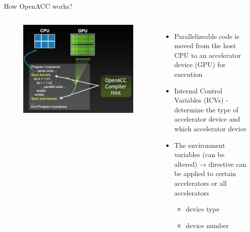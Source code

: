 \documentclass[aspectratio=169]{beamer}
\begin{document}
\begin{frame}[fragile]{How OpenACC works?}
\begin{columns}
\begin{figure}
\includegraphics[scale=0.3]{Graphics/How.png}
\end{figure}

\begin{itemize}
\item Parallelizeable code is moved from the host CPU to an accelerator device (GPU) for execution
\item Internal Control Variables (ICVs) - determine the type of accelerator device and which accelerator device
\item The environment variables (can be altered) → directive can be applied to certain accelerators or all accelerators 
\begin{itemize}
\item device type
\item device number
\end{itemize}
\end{itemize}

\end{columns}
\end{frame}
\end{document}
